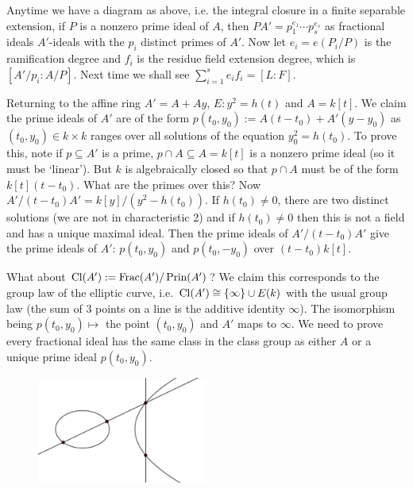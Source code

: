 \begin{ex}
\begin{enumerate}[(i)]
Anytime we have a diagram as above, i.e. the integral closure in a finite separable extension, if $P$ is a nonzero prime ideal of $A$, then $PA'=p_1^{e_1}\cdots p_s^{e_s}$ as fractional ideals $A'$-ideals with the $p_i$ distinct primes of $A'$. Now let $e_i=e(P_i/P)$ is the ramification degree and $f_i$ is the residue field extension degree, which is $[A'/p_i: A/P]$. Next time we shall see $\sum_{i=1}^s e_if_i= [L:F]$.


Returning to the affine ring $A'=A + Ay$, $E: y^2=h(t)$ and $A=k[t]$. We claim the prime ideals of $A'$ are of the form $p(t_0,y_0):=A(t-t_0) + A'(y-y_0)$ as $(t_0,y_0) \in k \times k$ ranges over all solutions of the equation $y^2_0=h(t_0)$. To prove this, note if $p \subseteq A'$ is a prime, $p \cap A \subseteq A=k[t]$ is a nonzero prime ideal (so it must be `linear'). But $k$ is algebraically closed so that $p \cap A$ must be of the form $k[t](t-t_0)$. What are the primes over this? Now $A'/(t-t_0)A'=k[y]/(y^2-h(t_0))$. If $h(t_0) \neq 0$, there are two distinct solutions (we are not in characteristic 2) and if $h(t_0) \neq 0$ then this is not a field and has a unique maximal ideal. Then the prime ideals of $A'/(t-t_0)A'$ give the prime ideals of $A'$: $p(t_0,y_0)$ and $p(t_0,-y_0)$ over $(t-t_0)k[t]$.

What about $\operatorname{Cl}(A'):=\operatorname{Frac}(A')/\operatorname{Prin}(A')$? We claim this corresponds to the group law of the elliptic curve, i.e. $\operatorname{Cl}(A') \cong \{\infty\} \cup E(k)$ with the usual group law (the sum of 3 points on a line is the additive identity $\infty$). The isomorphism being $p(t_0,y_0) \mapsto$ the point $(t_0,y_0)$ and $A'$ maps to $\infty$. We need to prove every fractional ideal has the same class in the class group as either $A$ or a unique prime ideal $p(t_0,y_0)$. 
        \begin{figure}[!ht]
        \centering
        \includegraphics[width=0.5\textwidth]{images/math620/ec.png} 
        \end{figure}


\end{enumerate}
\end{ex}
